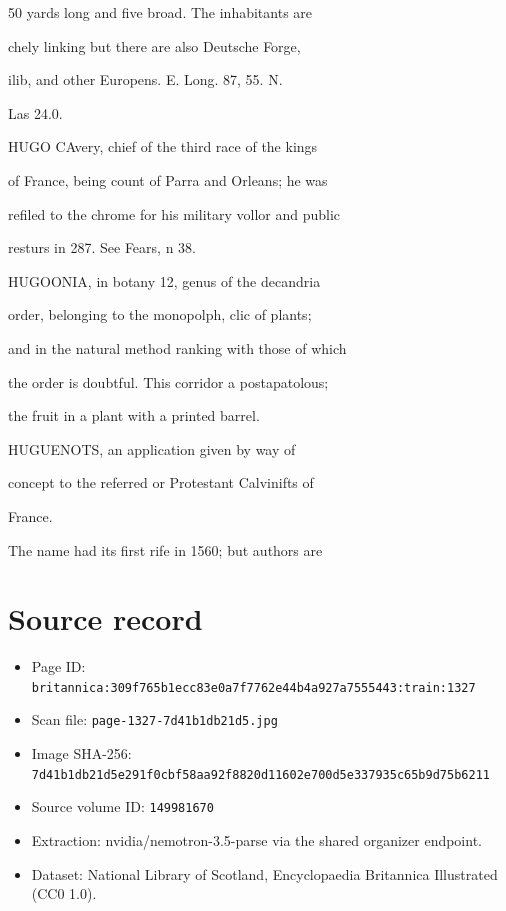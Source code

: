 \documentclass{article}
\begin{document}
50 yards long and five broad. The inhabitants are

chely linking but there are also Deutsche Forge,

ilib, and other Europens. E. Long. 87, 55. N.

Las 24.0.

HUGO CAvery, chief of the third race of the kings

of France, being count of Parra and Orleans; he was

refiled to the chrome for his military vollor and public

resturs in 287. See Fears, n 38.

HUGOONIA, in botany 12, genus of the decandria

order, belonging to the monopolph, clic of plants;

and in the natural method ranking with those of which

the order is doubtful. This corridor a postapatolous;

the fruit in a plant with a printed barrel.

HUGUENOTS, an application given by way of

concept to the referred or Protestant Calvinifts of

France.

The name had its first rife in 1560; but authors are

\section*{Source record}
\begin{itemize}
\item Page ID: \texttt{britannica:309f765b1ecc83e0a7f7762e44b4a927a7555443:train:1327}
\item Scan file: \texttt{page-1327-7d41b1db21d5.jpg}
\item Image SHA-256: \texttt{7d41b1db21d5e291f0cbf58aa92f8820d11602e700d5e337935c65b9d75b6211}
\item Source volume ID: \texttt{149981670}
\item Extraction: nvidia/nemotron-3.5-parse via the shared organizer endpoint.
\item Dataset: National Library of Scotland, Encyclopaedia Britannica Illustrated (CC0 1.0).
\end{itemize}
\end{document}

